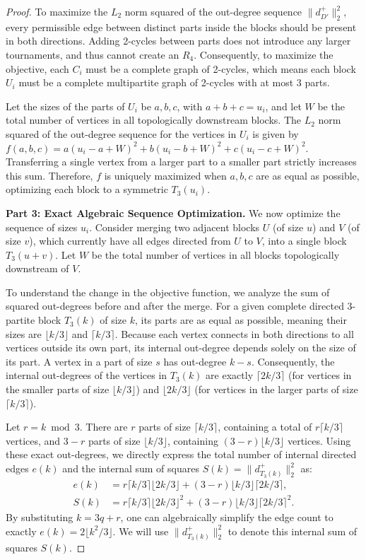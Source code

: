 \documentclass[a4paper]{amsart}
\begin{document}
\begin{proof}
    To maximize the $L_2$ norm squared of the out-degree sequence $\|d^+_{D'}\|_2^2$, every permissible edge between distinct parts inside the blocks should be present in both directions. Adding 2-cycles between parts does not introduce any larger tournaments, and thus cannot create an $R_4$. Consequently, to maximize the objective, each $C_i$ must be a complete graph of 2-cycles, which means each block $U_i$ must be a complete multipartite graph of 2-cycles with at most $3$ parts.

    Let the sizes of the parts of $U_i$ be $a, b, c$, with $a+b+c = u_i$, and let $W$ be the total number of vertices in all topologically downstream blocks. The $L_2$ norm squared of the out-degree sequence for the vertices in $U_i$ is given by $f(a,b,c) = a(u_i - a + W)^2 + b(u_i - b + W)^2 + c(u_i - c + W)^2$. Transferring a single vertex from a larger part to a smaller part strictly increases this sum. Therefore, $f$ is uniquely maximized when $a, b, c$ are as equal as possible, optimizing each block to a symmetric $T_3(u_i)$.

    \textbf{Part 3: Exact Algebraic Sequence Optimization.}
    We now optimize the sequence of sizes $u_i$. Consider merging two adjacent blocks $U$ (of size $u$) and $V$ (of size $v$), which currently have all edges directed from $U$ to $V$, into a single block $T_3(u+v)$. Let $W$ be the total number of vertices in all blocks topologically downstream of $V$.

    To understand the change in the objective function, we analyze the sum of squared out-degrees before and after the merge. For a given complete directed 3-partite block $T_3(k)$ of size $k$, its parts are as equal as possible, meaning their sizes are $\lfloor k/3 \rfloor$ and $\lceil k/3 \rceil$. Because each vertex connects in both directions to all vertices outside its own part, its internal out-degree depends solely on the size of its part. A vertex in a part of size $s$ has out-degree $k-s$. Consequently, the internal out-degrees of the vertices in $T_3(k)$ are exactly $\lceil 2k/3 \rceil$ (for vertices in the smaller parts of size $\lfloor k/3 \rfloor$) and $\lfloor 2k/3 \rfloor$ (for vertices in the larger parts of size $\lceil k/3 \rceil$).
    
    Let $r = k \bmod 3$. There are $r$ parts of size $\lceil k/3 \rceil$, containing a total of $r \lceil k/3 \rceil$ vertices, and $3-r$ parts of size $\lfloor k/3 \rfloor$, containing $(3-r) \lfloor k/3 \rfloor$ vertices. Using these exact out-degrees, we directly express the total number of internal directed edges $e(k)$ and the internal sum of squares $S(k) = \|d^+_{T_3(k)}\|_2^2$ as:
    \begin{align*}
        e(k) &= r \lceil k/3 \rceil \lfloor 2k/3 \rfloor + (3-r) \lfloor k/3 \rfloor \lceil 2k/3 \rceil, \\
        S(k) &= r \lceil k/3 \rceil \lfloor 2k/3 \rfloor^2 + (3-r) \lfloor k/3 \rfloor \lceil 2k/3 \rceil^2.
    \end{align*}
    By substituting $k=3q+r$, one can algebraically simplify the edge count to exactly $e(k) = 2 \lfloor k^2/3 \rfloor$. We will use $\|d^+_{T_3(k)}\|_2^2$ to denote this internal sum of squares $S(k)$.


\end{proof}
\end{document}
